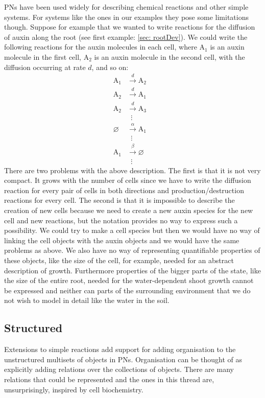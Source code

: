 \documentclass[phd]{infthesis}
\begin{document}
PNs have been used widely for describing chemical reactions and other simple
systems. For systems like the ones in our examples they pose some limitations
though. Suppose for example that we wanted to write reactions for the diffusion
of auxin along the root (see first example: \ref{sec: rootDev}). We could write
the following reactions for the auxin molecules in each cell, where
$\mathrm{A}_1$ is an auxin molecule in the first cell, $\mathrm{A}_2$ is an
auxin molecule in the second cell, with the diffusion occurring at rate
$d$, and so on:
\begin{align*}
\mathrm{A}_1 &\xrightarrow{d} \mathrm{A}_2 \\
\mathrm{A}_2 &\xrightarrow{d} \mathrm{A}_1 \\
\mathrm{A}_2 &\xrightarrow{d} \mathrm{A}_3\\
 &  \hspace{6pt}  \vdots& \\
\varnothing & \xrightarrow{\alpha} \mathrm{A}_1 \\
 & \hspace{6pt}  \vdots &\\
\mathrm{A}_1 &\xrightarrow{\beta} \varnothing \\
  & \hspace{6pt}  \vdots 
\end{align*}
There are two problems with the above description. The first is that it is not
very compact. It grows with the number of cells since we have to write the
diffusion reaction for every pair of cells in both directions and
production/destruction reactions for every cell. The second is that it is
impossible to describe the creation of new cells because we need to create a new
auxin species for the new cell and new reactions, but the notation provides no
way to express such a possibility. We could try to make a cell species but then
we would have no way of linking the cell objects with the auxin objects and we
would have the same problems as above. We also have no way of representing
quantifiable properties of these objects, like the size of the cell, for
example, needed for an abstract description of growth. Furthermore properties of
the bigger parts of the state, like the size of the entire root, needed for the
water-dependent shoot growth cannot be expressed and neither can parts of the
surrounding environment that we do not wish to model in detail like the water in
the soil.

\subsection{Structured}
Extensions to simple reactions add support for adding organisation to the
unstructured multisets of objects in PNs. Organisation can be thought of as
explicitly adding relations over the collections of objects. There are many
relations that could be represented and the ones in this thread are,
unsurprisingly, inspired by cell biochemistry.
\end{document}
